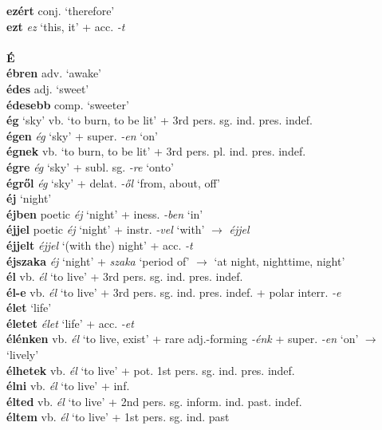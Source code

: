 \documentclass[11pt]{article}
\begin{document}
\textbf{ezért} conj. `therefore' \\
\textbf{ezt} \emph{ez} `this, it' + acc. \emph{-t} \\
\ \\
\noindent \textbf{\large É} \\
\textbf{ébren} adv. `awake' \\
\textbf{édes} adj. `sweet' \\
\textbf{édesebb} comp. `sweeter' \\
\textbf{ég} `sky' \textbar\textbar{} vb. `to burn, to be lit' + 3rd
pers. sg. ind. pres. indef. \\
\textbf{égen} \emph{ég} `sky' + super. \emph{-en} `on' \\
\textbf{égnek} vb. `to burn, to be lit' + 3rd pers. pl. ind. pres. indef. \\
\textbf{égre} \emph{ég} `sky' + subl. sg. \emph{-re} `onto' \\
\textbf{égről} \emph{ég} `sky' + delat. \emph{-ől} `from, about, off' \\
\textbf{éj} `night' \\
\textbf{éjben} poetic \emph{éj} `night' + iness. \emph{-ben} `in' \\
\textbf{éjjel} poetic \emph{éj} `night' + instr. \emph{-vel}
  `with' $\rightarrow$ \emph{éjjel} \\
\textbf{éjjelt} \emph{éjjel} `(with the) night' + acc. \emph{-t} \\
\textbf{éjszaka} \emph{éj} `night' + \emph{szaka} `period of'
    $\rightarrow$ `at night, nighttime, night' \\
\textbf{él} vb. \emph{él} `to live' + 3rd
pers. sg. ind. pres. indef. \\
\textbf{él-e} vb. \emph{él} `to live' + 3rd
pers. sg. ind. pres. indef. + polar interr. \emph{-e} \\
\textbf{élet} `life' \\
\textbf{életet} \emph{élet} `life' + acc. \emph{-et} \\
\textbf{élénken} vb. \emph{él} `to live, exist' + rare
adj.\hyp{}forming \emph{-énk} + super. \emph{-en} `on' $\rightarrow$
`lively' \\
\textbf{élhetek} vb. \emph{él} `to live' + pot. 1st
pers. sg. ind. pres. indef. \\
\textbf{élni} vb. \emph{él} `to live' + inf. \\
\textbf{élted} vb. \emph{él} `to live' + 2nd
pers. sg. inform. ind. past. indef. \\
\textbf{éltem} vb. \emph{él} `to live' + 1st pers. sg. ind. past \\
\end{document}
